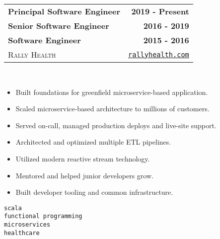 \documentclass[10pt,letterpaper]{article}
\newenvironment{details}
{\begin{itemize}}
{\end{itemize}}
\begin{document}
  \noindent\begin{tabularx}{\textwidth}{@{}X r@{}}
    \textbf{Principal Software Engineer} & \textbf{2019 - Present} \\
    \textbf{Senior Software Engineer} & \textbf{2016 - 2019} \\
    \textbf{Software Engineer} & \textbf{2015 - 2016} \\
    \textsc{Rally Health} & \texttt{\href{http://rallyhealth.com}{rallyhealth.com}}
  \end{tabularx}
  \hfill\\
  \noindent\begin{minipage}[t]{\dimexpr.7\textwidth-.7\columnsep}
    \raggedright
    \begin{details}
    \item Built foundations for greenfield microservice-based application.
    \item Scaled microservice-based architecture to millions of customers.
    \item Served on-call, managed production deploys and live-site support.
    \item Architected and optimized multiple ETL pipelines.
    \item Utilized modern reactive stream technology.
    \item Mentored and helped junior developers grow.
    \item Built developer tooling and common infrastructure.
    \end{details}
  \end{minipage}%
  \begin{minipage}[t]{\dimexpr.32\textwidth-.32\columnsep}
    \raggedleft
    \texttt{scala} \\
    \texttt{functional programming} \\
    \texttt{microservices} \\
    \texttt{healthcare}
  \end{minipage}

  \hfill\\
\end{document}
